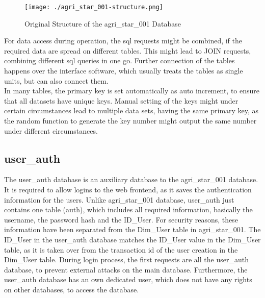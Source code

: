 \begin{figure}[h!]
 \centering
 \texttt{[image: ./agri\_star\_001-structure.png]}
 \caption{Original Structure of the agri\_star\_001 Database}
\end{figure}

\noindent For data access during operation, the sql requests might be combined, if the required data are spread on different tables. This might lead to JOIN requests, combining 
different sql queries in one go. Further connection of the tables happens over the interface software, which usually treats the tables as single units, but can also connect them.\\
In many tables, the primary key is set automatically as auto increment, to ensure that all datasets have unique keys. Manual setting of the keys might under certain circumstances 
lead to multiple data sets, having the same primary key, as the random function to generate the key number might output the same number under different circumstances.

\subsection{user\_auth}

The user\_auth database is an auxiliary database to the agri\_star\_001 database. It is required to allow logins to the web frontend, as it saves the authentication information 
for the users. Unlike agri\_star\_001 database, user\_auth just contains one table (auth), which includes all required information, basically the username, the password hash and the 
ID\_User. For security reasons, these information have been separated from the Dim\_User table in agri\_star\_001. The ID\_User in the user\_auth database matches the ID\_User 
value in the Dim\_User table, as it is taken over from the transaction id of the user creation in the Dim\_User table. During login process, the first requests are all the 
user\_auth database, to prevent external attacks on the main database. Furthermore, the user\_auth database has an own dedicated user, which does not have any rights on other 
databases, to access the database.

